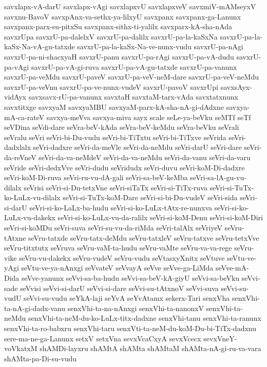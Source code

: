 {savxlapx-vA-darU
savxlapx-vAgi
savxlapxvU
savxlapxveV
savxmiV-mAMseyxV
savxnu-BavoV
savxpAnx-va-sethx-ya-lilxyU
savxpanx
savxpanx-ga-Lanunx
savxpanx-parx-su-pitxSu
savxpanx-sithx-ti-yalilx
savxparx-kA-sha-nAda
savxrUpa
savxrU-pa-dalelxV
savxrU-pa-dalilx
savxrU-pa-la-kaSxNa
savxrU-pa-la-kaSx-Na-vA-gu-tatxde
savxrU-pa-la-kaSx-Na-ve-nunx-vudu
savxrU-pa-nAgi
savxrU-pa-ni-shacxyaH
savxrU-panu
savxrU-pa-rAgi
savxrU-pa-vA-dudu
savxrU-pa-vAgi
savxrU-pa-vA-gi-ruva
savxrU-pa-vA-gu-tatxde
savxrU-pa-vanunx
savxrU-pa-veMdu
savxrU-paveV
savxrU-pa-veV-neM-dare
savxrU-pa-veV-neMdu
savxrU-pa-veVnu
savxrU-pa-ve-nunx-vudeV
savxrU-pavoV
savxrUpi
savxsAyx-vidAyx
savxsavx-rU-pa-vanunx
savxtaH
savxtaM-tarx-vAda
savxtatxnunx
savxtitxge
savxyaM
savxyaMBU
savxyaM-parx-kA-sha-nA-gi-dAdxne
savxya-mA-ca-rateV
savxya-meVva
savxya-miva
sayx
scale
seLe-ya-beVku
seMTf
seTf
seVDina
seVdi-dare
seVra-beV-kAda
seVra-beV-keMdu
seVra-beVku
seVrali
seVralu
seVri
seVri-bi-Du-vudu
seVri-bi-TiTxtu
seVri-bi-TiTxve
seVrida
seVri-dadxlalx
seVri-dadxre
seVri-da-meVle
seVri-da-neMdu
seVri-darU
seVri-dare
seVri-da-reVneV
seVri-da-va-neMdeV
seVri-da-va-neMdu
seVri-da-vanu
seVri-da-varu
seVride
seVri-dedxVve
seVri-dudu
seVridudx
seVri-duvu
seVri-koM-Di-dadxre
seVri-koM-Di-ruva
seVri-ru-vu-dA-gali
seVri-sa-beV-keMba
seVri-sa-lA-gu-vu-dilalx
seVrisi
seVri-si-Du-tetxVne
seVri-siTaTx
seVri-si-TiTx-ruva
seVri-si-TuTx-ko-LuLx-vu-dilalx
seVri-si-TuTx-koM-Dare
seVri-si-bi-Du-vudeV
seVri-sida
seVri-si-darU
seVri-si-ko-LaLx-ba-hudu
seVri-si-ko-LuLx-tAtx-re-nunxva
seVri-si-ko-LuLx-vu-dakekx
seVri-si-ko-LuLx-vu-da-ralilx
seVri-si-koM-Denu
seVri-si-koM-Diri
seVri-si-koMDu
seVri-suva
seVri-su-vu-da-riMda
seVri-talAlx
seVriyeV
seVru-tAtxne
seVru-tatxde
seVru-tatx-deMdu
seVru-tatxleV
seVru-tatxve
seVru-tetxVve
seVru-titxtutx
seVruva
seVru-vaM-ta-hudu
seVru-vaMte
seVru-va-va-rege
seVru-vike
seVru-vu-dakekx
seVru-vudeV
seVru-vudu
seVtasxyXnitx
seVtuve
seVtu-ve-yAgi
seVtu-ve-ya-nAnxgi
seVvateV
seVvayA
seVve
seVve-ga-LiMda
seVve-mA-Dida
seVve-yanunx
seVvi-sa-ba-hudu
seVvi-sa-beV-kA-giyU
seVvi-sa-beVku
seVvi-sade
seVvisi
seVvi-si-darU
seVvi-si-dare
seVvi-su-tAtxnoV
seVvi-suva
seVvi-su-vudU
seVvi-su-vudu
seYkA-laji
seYvA
seYvAtamx
sekerx-Tari
senxVha
senxVhi-ta-nA-gi-dadx-vanu
senxVhi-ta-na-nAnxgi
senxVhi-ta-nanonxV
senxVhi-ta-neMdu
senxVhi-ta-neM-du-ko-LuLx-titx-dadxne
senxVhi-tanu
senxVhi-ta-ranunx
senxVhi-ta-ro-babxru
senxVhi-taru
senxVti-ta-neM-du-koM-Du-bi-TiTx-dadxnu
sere-ma-ne-ga-Lanunx
setxV
setxVna
sevxVcaCxyA
sevxVcecx
sevxVneY-voVkatxM
shAMDi-layxru
shAMtA
shAMta
shAMtaM
shAMta-nA-gi-ru-va-vara
shAMta-pa-Di-su-vudu
}
